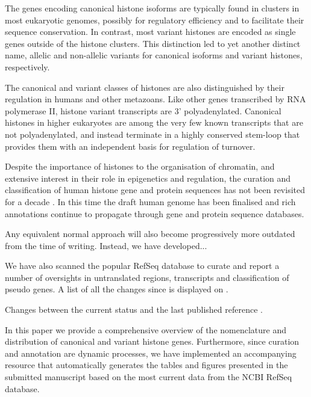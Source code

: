   The genes encoding canonical histone isoforms are typically found in clusters in most eukaryotic
  genomes, possibly for regulatory efficiency and to facilitate their sequence conservation. In
  contrast, most variant histones are encoded as single genes outside of the histone clusters.
  This distinction led to yet another distinct name, allelic and non-allelic variants for
  canonical isoforms and variant histones, respectively\addref{}.

  The canonical and variant classes of histones are also distinguished by their regulation in humans and other
  metazoans. Like other genes transcribed by RNA polymerase II,  histone variant transcripts
  are 3' polyadenylated. Canonical histones in higher eukaryotes are among the very few known transcripts
  that are not polyadenylated, and instead terminate in a highly conserved stem-loop that
  provides them with an independent basis for regulation of turnover.


  Despite the importance of histones to the organisation of chromatin, and extensive interest
  in their role in epigenetics and regulation, the curation and classification of human histone
  gene and protein sequences has not been revisited for a decade \citep{Marzluff02}. In this time
  the draft human genome has been finalised and rich annotations continue to propagate through
  gene and protein sequence databases.

  Any equivalent normal approach will also become progressively more outdated from the
  time of writing. Instead, we have developed...

  We have also scanned the popular RefSeq
  database to curate and report a number of oversights in untranslated regions, transcripts and
  classification of pseudo genes. A list of all the changes since \cite{Marzluff02} is 
  displayed on  .

  \begin{table*}
    \caption{Changes between the current status and the last published reference \citep{Marzluff02}.}
    \label{tab:difference-from-Marzluff02}
    \centering
    
  \end{table*}

  In this paper we provide a comprehensive overview of the nomenclature and distribution
  of canonical and variant histone genes. Furthermore, since curation and annotation are
  dynamic processes, we have implemented an accompanying resource that automatically generates
  the tables and figures presented in the submitted manuscript based
  on the most current data from the NCBI RefSeq database.

